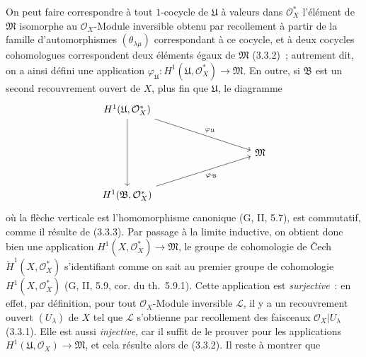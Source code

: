 \begin{env}[5.4.7]
On peut faire correspondre à tout $1$-cocycle de $\mathfrak{U}$ à valeurs
dans $\mathcal{O}_X^*$ l'élément de $\mathfrak{M}$ isomorphe au
$\mathcal{O}_X$-Module inversible obtenu par recollement à partir de la
famille d'automorphismes $(\theta_{\lambda\mu})$ correspondant à ce cocycle,
et à deux cocycles cohomologues correspondent deux éléments égaux de
$\mathfrak{M}$ (3.3.2)~; autrement dit, on a ainsi défini une application
$\varphi_{\mathfrak{U}}:H^1(\mathfrak{U},\mathcal{O}_X^*)\to\mathfrak{M}$.
En outre, si $\mathfrak{B}$ est un second recouvrement ouvert de $X$, plus fin
que $\mathfrak{U}$, le diagramme
\[
\begin{tikzcd}[column sep=huge,row sep=large]
H^1(\mathfrak{U},\mathcal{O}_X^*)
  \arrow[dd]
  \arrow[rrd,"\varphi_{\mathfrak{U}}"] & & \\
& & \mathfrak{M} \\
H^1(\mathfrak{B},\mathcal{O}_X^*)
  \arrow[rru,swap,"\varphi_{\mathfrak{B}}"] & &
\end{tikzcd}
\]
où la flèche verticale est l'homomorphisme canonique (G, II, 5.7), est
commutatif, comme il résulte de (3.3.3). Par passage à la limite inductive, on
obtient donc bien une application
$H^1(X,\mathcal{O}_X^*)\to\mathfrak{M}$, le groupe de cohomologie de \v{C}ech
$\check{H}^1(X,\mathcal{O}_X^*)$ s'identifiant comme on sait au premier groupe
de cohomologie $H^1(X,\mathcal{O}_X^*)$ (G, II, 5.9, cor. du th.~5.9.1).
Cette application est \emph{surjective}~: en effet, par définition, pour tout
$\mathcal{O}_X$-Module inversible $\mathcal{L}$, il y a un recouvrement ouvert
$(U_\lambda)$ de $X$ tel que $\mathcal{L}$ s'obtienne par recollement des
faisceaux $\mathcal{O}_X|U_\lambda$ (3.3.1). Elle est aussi
\emph{injective}, car il suffit de le prouver pour les applications
$H^1(\mathfrak{U},\mathcal{O}_X)\to\mathfrak{M}$, et cela résulte alors de
(3.3.2). Il reste à montrer que



\end{env}
